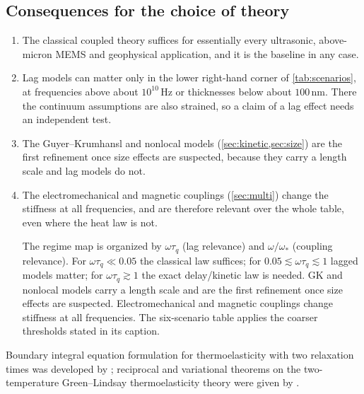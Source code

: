 \subsection{Consequences for the choice of theory}
\begin{enumerate}
\item The classical coupled theory suffices for essentially every ultrasonic, above-micron MEMS and geophysical application, and it is the baseline in any case.
\item Lag models can matter only in the lower right-hand corner of \cref{tab:scenarios}, at frequencies above about $10^{10}$\,Hz or thicknesses below about $100$\,nm. There the continuum assumptions are also strained, so a claim of a lag effect needs an independent test.
\item The Guyer--Krumhansl and nonlocal models (\cref{sec:kinetic,sec:size}) are the first refinement once size effects are suspected, because they carry a length scale and lag models do not.
\item The electromechanical and magnetic couplings (\cref{sec:multi}) change the stiffness at all frequencies, and are therefore relevant over the whole table, even where the heat law is not.

\begin{summarybox}[Summary]
The regime map is organized by $\omega\tau_q$ (lag relevance) and $\omega/\omega_*$ (coupling relevance). For $\omega\tau_q\ll0.05$ the classical law suffices; for $0.05\lesssim\omega\tau_q\lesssim1$ lagged models matter; for $\omega\tau_q\gtrsim1$ the exact delay/kinetic law is needed. GK and nonlocal models carry a length scale and are the first refinement once size effects are suspected. Electromechanical and magnetic couplings change stiffness at all frequencies. The six-scenario table applies the coarser thresholds stated in its caption.
\end{summarybox}
\end{enumerate}
Boundary integral equation formulation for thermoelasticity with two relaxation times was developed by \citep{Anwar1994}; reciprocal and variational theorems on the two-temperature Green--Lindsay thermoelasticity theory were given by \citep{Sachan2022}.
